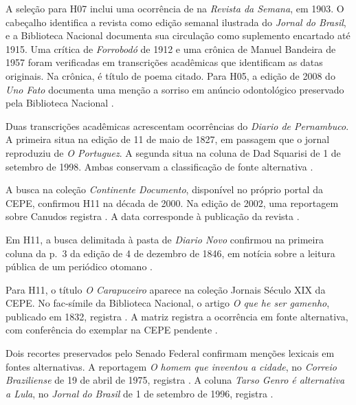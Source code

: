 A seleção para H07 inclui uma ocorrência de  na \textit{Revista da Semana}, em 1903. O cabeçalho identifica a revista como edição semanal ilustrada do \textit{Jornal do Brasil}, e a Biblioteca Nacional documenta sua circulação como suplemento encartado até 1915. Uma crítica de \textit{Forrobodó} de 1912 e uma crônica de Manuel Bandeira de 1957 foram verificadas em transcrições acadêmicas que identificam as datas originais. Na crônica,  é título de poema citado. Para H05, a edição de 2008 do \textit{Uno Fato} documenta uma menção a sorriso em anúncio odontológico preservado pela Biblioteca Nacional \cite{acervoD103,acervoD104,acervoD105,acervoD106}.

Duas transcrições acadêmicas acrescentam ocorrências do \textit{Diario de Pernambuco}. A primeira situa  na edição de 11 de maio de 1827, em passagem que o jornal reproduziu de \textit{O Portuguez}. A segunda situa  na coluna de Dad Squarisi de 1 de setembro de 1998. Ambas conservam a classificação de fonte alternativa \cite{acervoD107,acervoD108}.

A busca na coleção \textit{Continente Documento}, disponível no próprio portal da CEPE, confirmou H11 na década de 2000. Na edição de 2002, uma reportagem sobre Canudos registra . A data corresponde à publicação da revista \cite{acervoD109}.

Em H11, a busca delimitada à pasta de \textit{Diario Novo} confirmou  na primeira coluna da p.~3 da edição de 4 de dezembro de 1846, em notícia sobre a leitura pública de um periódico otomano \cite{acervoD110}.

Para H11, o título \textit{O Carapuceiro} aparece na coleção Jornais Século XIX da CEPE. No fac-símile da Biblioteca Nacional, o artigo \textit{O que he ser gamenho}, publicado em 1832, registra . A matriz registra a ocorrência em fonte alternativa, com conferência do exemplar na CEPE pendente \cite{acervoD111}.

Dois recortes preservados pelo Senado Federal confirmam menções lexicais em fontes alternativas. A reportagem \textit{O homem que inventou a cidade}, no \textit{Correio Braziliense} de 19 de abril de 1975, registra . A coluna \textit{Tarso Genro é alternativa a Lula}, no \textit{Jornal do Brasil} de 1 de setembro de 1996, registra  \cite{acervoD112,acervoD113}.

